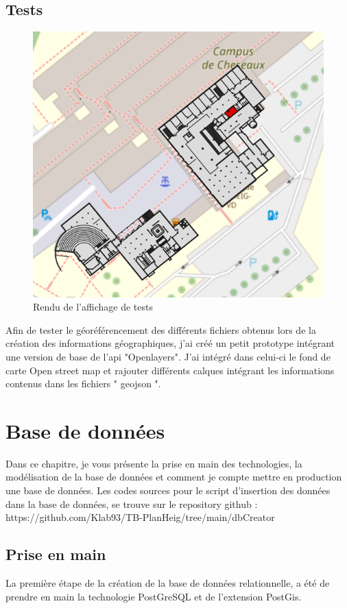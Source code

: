 \documentclass[
    iai, %
    il, %
]{heig-tb}
\begin{document}
\section{Tests}
\begin{figure}[H]
    \caption{Rendu de l'affichage de tests}
    \centering
    \includegraphics{TestsData.png}
\end{figure}

Afin de tester le géoréférencement des différents fichiers obtenus lors de la création des informations géographiques,
j'ai créé un petit prototype intégrant une version de base de l'api "Openlayers".
J'ai intégré dans celui-ci le fond de carte Open street map et rajouter différents calques intégrant les informations contenus dans les fichiers " geojson ".

\chapter{Base de données}

Dans ce chapitre, je vous présente la prise en main des technologies,
la modélisation de la base de données et comment je compte mettre en production une base de données.
Les codes sources pour le script d'insertion des données dans la base de données,
se trouve sur le repository github : https://github.com/Klab93/TB-PlanHeig/tree/main/dbCreator

\section{Prise en main}
La première étape de la création de la base de données relationnelle,
a été de prendre en main la technologie PostGreSQL et de l'extension PostGis.
\end{document}
